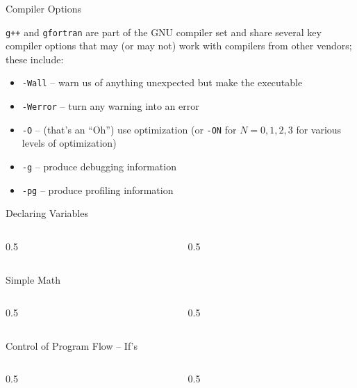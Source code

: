 \documentclass[aspectratio=1610]{beamer}
\begin{document}
\begin{frame}{Compiler Options}

{\tt g++} and {\tt gfortran} are part of the GNU compiler set and share 
several key compiler options that may (or may not) work with compilers from
other vendors; these include:
\begin{itemize}
 \item {\tt -Wall} -- warn us of anything unexpected but make the executable
 \item {\tt -Werror} -- turn any warning into an error
 \item {\tt -O} -- (that's an ``Oh'') use optimization (or {\tt -ON} for $N=0,1,2,3$ for 
       various levels of optimization)
 \item {\tt -g} -- produce debugging information
 \item {\tt -pg} -- produce profiling information
\end{itemize}


\end{frame}

\begin{frame}{Declaring Variables}
\begin{columns}[c]
  \begin{column}{0.5\textwidth}
    
  \end{column}
  \begin{column}{0.5\textwidth}
    
  \end{column}
\end{columns}
\end{frame}

\begin{frame}{Simple Math}
\begin{columns}[c]
  \begin{column}{0.5\textwidth}
    
  \end{column}
  \begin{column}{0.5\textwidth}
    
  \end{column}
\end{columns}
\end{frame}

\begin{frame}{Control of Program Flow -- If's}
\begin{columns}[c]
  \begin{column}{0.5\textwidth}
    
  \end{column}
  \begin{column}{0.5\textwidth}
    
  \end{column}
\end{columns}
\end{frame}
\end{document}
